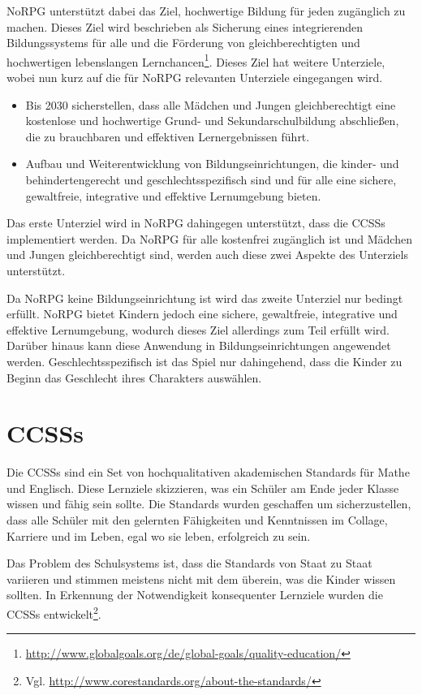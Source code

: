 NoRPG unterstützt dabei das Ziel, hochwertige Bildung für jeden zugänglich zu machen. Dieses Ziel wird beschrieben als Sicherung eines integrierenden Bildungssystems für alle und die Förderung von gleichberechtigten und hochwertigen lebenslangen Lernchancen\footnote{\url{http://www.globalgoals.org/de/global-goals/quality-education/}}. Dieses Ziel hat weitere Unterziele, wobei nun kurz auf die für NoRPG relevanten Unterziele eingegangen wird.

\begin{itemize}
\item Bis 2030 sicherstellen, dass alle Mädchen und Jungen gleichberechtigt eine kostenlose und hochwertige Grund- und Sekundarschulbildung abschließen, die zu brauchbaren und effektiven Lernergebnissen führt.

\item Aufbau und Weiterentwicklung von Bildungseinrichtungen, die kinder- und behindertengerecht und geschlechtsspezifisch sind und für alle eine sichere, gewaltfreie, integrative und effektive Lernumgebung bieten.
\end{itemize}

Das erste Unterziel wird in NoRPG dahingegen unterstützt, dass die \acfp{CCSS} implementiert werden. Da NoRPG für alle kostenfrei zugänglich ist und Mädchen und Jungen gleichberechtigt sind, werden auch diese zwei Aspekte des Unterziels unterstützt. 

Da NoRPG keine Bildungseinrichtung ist wird das zweite Unterziel nur bedingt erfüllt. NoRPG bietet Kindern jedoch eine sichere, gewaltfreie, integrative und effektive Lernumgebung, wodurch dieses Ziel allerdings zum Teil erfüllt wird. Darüber hinaus kann diese Anwendung in Bildungseinrichtungen angewendet werden. Geschlechtsspezifisch ist das Spiel nur dahingehend, dass die Kinder zu Beginn das Geschlecht ihres Charakters auswählen.

\section{\aclp{CCSS}}
Die \acp{CCSS} sind ein Set von hochqualitativen akademischen Standards für Mathe und Englisch. Diese Lernziele skizzieren, was ein Schüler am Ende jeder Klasse wissen und fähig sein sollte. Die Standards wurden geschaffen um sicherzustellen, dass alle Schüler mit den gelernten Fähigkeiten und Kenntnissen im Collage, Karriere und im Leben, egal wo sie leben, erfolgreich zu sein.

Das Problem des Schulsystems ist, dass die Standards von Staat zu Staat variieren und stimmen meistens nicht mit dem überein, was die Kinder wissen sollten. In Erkennung der Notwendigkeit konsequenter Lernziele wurden die \acp{CCSS} entwickelt\footnote{Vgl. \url{http://www.corestandards.org/about-the-standards/}}.

